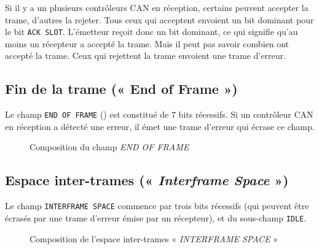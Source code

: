 Si il y a un plusieurs contrôleurs CAN en réception, certains peuvent accepter la trame, d'autres la rejeter. Tous ceux qui acceptent envoient un bit dominant pour le bit \texttt{ACK SLOT}. L'émetteur reçoit donc un bit dominant, ce qui signifie qu'au moins un récepteur a accepté la trame. Mais il peut pas savoir combien ont accepté la trame. Ceux qui rejettent la trame envoient une trame d'erreur.




\subsection{Fin de la trame (« End of Frame »)}

Le champ \texttt{END OF FRAME} () est constitué de $7$ bits récessifs. Si un contrôleur CAN en réception a détecté une erreur, il émet une trame d'erreur qui écrase ce champ.


\begin{figure}[h]
  \centering
  \caption{Composition du champ \emph{END OF FRAME}}
\end{figure}


\subsection{Espace inter-trames (« \emph{Interframe Space} »)}

Le champ \texttt{INTERFRAME SPACE} commence par trois bits récessifs (qui peuvent être écrasés par une trame d'erreur émise par un récepteur), et du sous-champ \texttt{IDLE}.

\begin{figure}[h]
  \centering
  \caption{Composition de l'espace inter-trames « \emph{INTERFRAME SPACE} »}
\end{figure}

